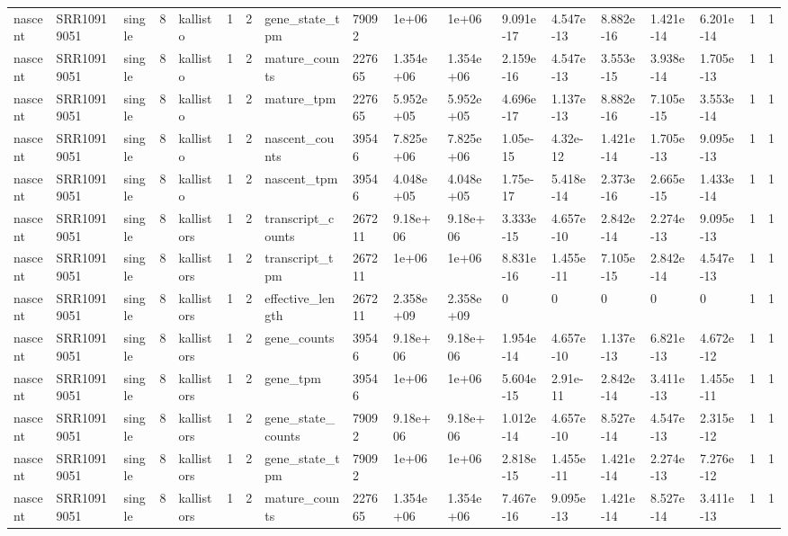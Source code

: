 \begin{tabular}{llllllllllllllllll}
nascent & SRR10919051 & single & 8 & kallisto & 1 & 2 & gene\_state\_tpm & 79092 & 1e+06 & 1e+06 & 9.091e-17 & 4.547e-13 & 8.882e-16 & 1.421e-14 & 6.201e-14 & 1 & 1 \\
nascent & SRR10919051 & single & 8 & kallisto & 1 & 2 & mature\_counts & 227665 & 1.354e+06 & 1.354e+06 & 2.159e-16 & 4.547e-13 & 3.553e-15 & 3.938e-14 & 1.705e-13 & 1 & 1 \\
nascent & SRR10919051 & single & 8 & kallisto & 1 & 2 & mature\_tpm & 227665 & 5.952e+05 & 5.952e+05 & 4.696e-17 & 1.137e-13 & 8.882e-16 & 7.105e-15 & 3.553e-14 & 1 & 1 \\
nascent & SRR10919051 & single & 8 & kallisto & 1 & 2 & nascent\_counts & 39546 & 7.825e+06 & 7.825e+06 & 1.05e-15 & 4.32e-12 & 1.421e-14 & 1.705e-13 & 9.095e-13 & 1 & 1 \\
nascent & SRR10919051 & single & 8 & kallisto & 1 & 2 & nascent\_tpm & 39546 & 4.048e+05 & 4.048e+05 & 1.75e-17 & 5.418e-14 & 2.373e-16 & 2.665e-15 & 1.433e-14 & 1 & 1 \\
nascent & SRR10919051 & single & 8 & kallistors & 1 & 2 & transcript\_counts & 267211 & 9.18e+06 & 9.18e+06 & 3.333e-15 & 4.657e-10 & 2.842e-14 & 2.274e-13 & 9.095e-13 & 1 & 1 \\
nascent & SRR10919051 & single & 8 & kallistors & 1 & 2 & transcript\_tpm & 267211 & 1e+06 & 1e+06 & 8.831e-16 & 1.455e-11 & 7.105e-15 & 2.842e-14 & 4.547e-13 & 1 & 1 \\
nascent & SRR10919051 & single & 8 & kallistors & 1 & 2 & effective\_length & 267211 & 2.358e+09 & 2.358e+09 & 0 & 0 & 0 & 0 & 0 & 1 & 1 \\
nascent & SRR10919051 & single & 8 & kallistors & 1 & 2 & gene\_counts & 39546 & 9.18e+06 & 9.18e+06 & 1.954e-14 & 4.657e-10 & 1.137e-13 & 6.821e-13 & 4.672e-12 & 1 & 1 \\
nascent & SRR10919051 & single & 8 & kallistors & 1 & 2 & gene\_tpm & 39546 & 1e+06 & 1e+06 & 5.604e-15 & 2.91e-11 & 2.842e-14 & 3.411e-13 & 1.455e-11 & 1 & 1 \\
nascent & SRR10919051 & single & 8 & kallistors & 1 & 2 & gene\_state\_counts & 79092 & 9.18e+06 & 9.18e+06 & 1.012e-14 & 4.657e-10 & 8.527e-14 & 4.547e-13 & 2.315e-12 & 1 & 1 \\
nascent & SRR10919051 & single & 8 & kallistors & 1 & 2 & gene\_state\_tpm & 79092 & 1e+06 & 1e+06 & 2.818e-15 & 1.455e-11 & 1.421e-14 & 2.274e-13 & 7.276e-12 & 1 & 1 \\
nascent & SRR10919051 & single & 8 & kallistors & 1 & 2 & mature\_counts & 227665 & 1.354e+06 & 1.354e+06 & 7.467e-16 & 9.095e-13 & 1.421e-14 & 8.527e-14 & 3.411e-13 & 1 & 1 \\

\end{tabular}
